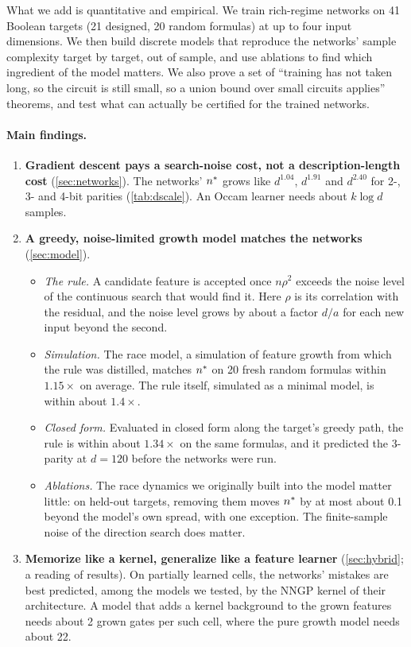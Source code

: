 What we add is quantitative and empirical. We train rich-regime networks on 41 Boolean targets (21 designed, 20 random formulas) at up to four input dimensions. We then build discrete models that reproduce the networks' sample complexity target by target, out of sample, and use ablations to find which ingredient of the model matters. We also prove a set of ``training has not taken long, so the circuit is still small, so a union bound over small circuits applies'' theorems, and test what can actually be certified for the trained networks.

\paragraph{Main findings.}
\begin{enumerate}
\item \textbf{Gradient descent pays a search-noise cost, not a description-length cost} (\cref{sec:networks}). The networks' $n^{*}$ grows like $d^{1.04}$, $d^{1.91}$ and $d^{2.40}$ for 2-, 3- and 4-bit parities (\cref{tab:dscale}). An Occam learner needs about $k\log d$ samples.
\item \textbf{A greedy, noise-limited growth model matches the networks} (\cref{sec:model}).
  \begin{itemize}
  \item \emph{The rule.} A candidate feature is accepted once $n\rho^2$ exceeds the noise level of the continuous search that would find it. Here $\rho$ is its correlation with the residual, and the noise level grows by about a factor $d/a$ for each new input beyond the second.
  \item \emph{Simulation.} The race model, a simulation of feature growth from which the rule was distilled, matches $n^{*}$ on 20 fresh random formulas within $1.15\times$ on average. The rule itself, simulated as a minimal model, is within about $1.4\times$.
  \item \emph{Closed form.} Evaluated in closed form along the target's greedy path, the rule is within about $1.34\times$ on the same formulas, and it predicted the 3-parity at $d=120$ before the networks were run.
  \item \emph{Ablations.} The race dynamics we originally built into the model matter little: on held-out targets, removing them moves $n^{*}$ by at most about 0.1 beyond the model's own spread, with one exception. The finite-sample noise of the direction search does matter.
  \end{itemize}
\item \textbf{Memorize like a kernel, generalize like a feature learner} (\cref{sec:hybrid}; a  reading of  results). On partially learned cells, the networks' mistakes are best predicted, among the models we tested, by the NNGP kernel of their architecture. A model that adds a kernel background to the grown features needs about 2 grown gates per such cell, where the pure growth model needs about 22.

\end{enumerate}
